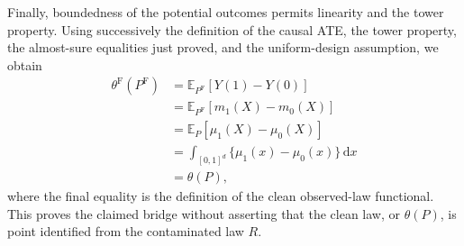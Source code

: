 Finally, boundedness of the potential outcomes permits linearity and the tower
property.  Using successively the definition of the causal ATE, the tower
property, the almost-sure equalities just proved, and the uniform-design
assumption, we obtain
\[
\begin{aligned}
\theta^{\mathrm F}(P^{\mathrm F})
&=\mathbb E_{P^{\mathrm F}}[Y(1)-Y(0)]\\
&=\mathbb E_{P^{\mathrm F}}[m_1(X)-m_0(X)]\\
&=\mathbb E_P[\mu_1(X)-\mu_0(X)]\\
&=\int_{[0,1]^d}\{\mu_1(x)-\mu_0(x)\}\,\mathrm dx\\
&=\theta(P),
\end{aligned}
\]
where the final equality is the definition of the clean observed-law
functional.  This proves the claimed bridge without asserting that the clean
law, or \(\theta(P)\), is point identified from the contaminated law \(R\).
